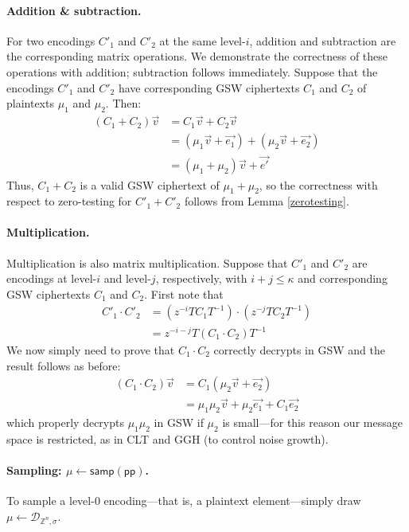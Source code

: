 \paragraph{Addition \& subtraction.}  For two encodings $C'_1$ and $C'_2$ at the same level-$i$, addition and subtraction are the corresponding matrix operations.  We demonstrate the correctness of these operations with addition; subtraction follows immediately.  Suppose that the encodings $C'_1$ and $C'_2$ have corresponding GSW ciphertexts $C_1$ and $C_2$ of plaintexts $\mu_1$ and $\mu_2$.  Then:
\begin{align*}
(C_1 + C_2)\vec{v} &= C_1\vec{v} + C_2\vec{v}\\
&= (\mu_1 \vec{v} + \vec{e_1}) + (\mu_2 \vec{v} + \vec{e_2})\\
&= (\mu_1 + \mu_2)\vec{v} + \vec{e'}
\end{align*}
Thus, $C_1+ C_2$ is a valid GSW ciphertext of $\mu_1 + \mu_2$, so the correctness with respect to zero-testing for $C'_1 + C'_2$ follows from Lemma \ref{zerotesting}.

\paragraph{Multiplication.}  Multiplication is also matrix multiplication.  Suppose that $C'_1$ and $C'_2$ are encodings at level-$i$ and level-$j$, respectively, with $i+j \leq \kappa$ and corresponding GSW ciphertexts $C_1$ and $C_2$.  First note that
\begin{align*}
C'_1\cdot C'_2 &= (z^{-i}TC_1T^{-1})\cdot(z^{-j}TC_2T^{-1})\\
&= z^{-i-j}T(C_1\cdot C_2)T^{-1}
\end{align*}
We now simply need to prove that $C_1 \cdot C_2$ correctly decrypts in GSW and the result follows as before:
\begin{align*}
(C_1\cdot C_2)\vec{v} &= C_1(\mu_2 \vec{v} + \vec{e_2}) \\
&= \mu_1\mu_2\vec{v} + \mu_2\vec{e_1} + C_1\vec{e_2}
\end{align*}
which properly decrypts $\mu_1\mu_2$ in GSW if $\mu_2$ is small---for this reason our message space is restricted, as in CLT and GGH (to control noise growth).

\paragraph{Sampling:  $\mu \leftarrow \mathsf{samp}(\mathsf{pp})$.}  To sample a level-0 encoding---that is, a plaintext element---simply draw $\mu\leftarrow \mathcal{D}_{\mathbb{Z}^n, \sigma}$.


